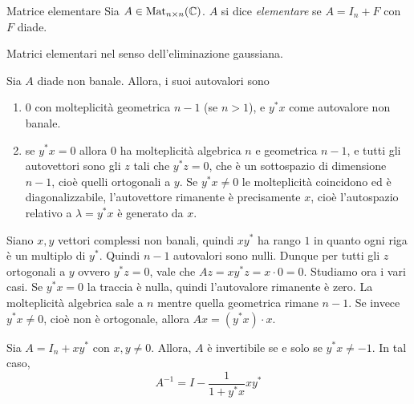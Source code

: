 \documentclass[a4paper]{article}
\begin{document}
\begin{snippetdefinition}{Matrice elementare}
    Sia \(A \in \operatorname{Mat}_{n \times n}(\mathbb{C})\).
    \(A\) si dice \emph{elementare} se \(A = I_n + F\)
    con \(F\) diade.
\end{snippetdefinition}

Matrici elementari nel senso dell'eliminazione gaussiana.

\begin{snippetproposition}{}
    Sia \(A\) diade non banale. Allora, i suoi autovalori sono
    \begin{enumerate}
        \item \(0\) con molteplicità geometrica \(n-1\) (se \(n>1\)),
            e \(y^*x\) come autovalore non banale.
        \item se \(y^*x = 0\) allora \(0\) ha molteplicità algebrica \(n\) e geometrica \(n-1\),
            e tutti gli autovettori sono gli \(z\) tali che \(y^*z = 0\), che è un sottospazio di dimensione \(n-1\), cioè quelli ortogonali a \(y\).
            Se \(y^*x \neq 0\) le molteplicità coincidono ed è diagonalizzabile, l'autovettore rimanente è precisamente \(x\),
            cioè l'autospazio relativo a \(\lambda = y^*x\) è generato da \(x\).
    \end{enumerate}
\end{snippetproposition}

\begin{snippetproof}{}
    Siano \(x,y\) vettori complessi non banali, quindi \(xy^*\) ha rango \(1\)
    in quanto ogni riga è un multiplo di \(y^*\).
    Quindi \(n-1\) autovalori sono nulli.
    Dunque per tutti gli \(z\) ortogonali a \(y\) ovvero \(y^*z = 0\),
    vale che \(Az = xy^*z = x \cdot 0 = 0\).
    Studiamo ora i vari casi. Se \(y^*x=0\) la traccia è nulla, quindi l'autovalore rimanente è zero.
    La molteplicità algebrica sale a \(n\) mentre quella geometrica rimane \(n-1\).
    Se invece \(y^*x \neq 0\), cioè non è ortogonale, allora \(Ax = (y^*x)\cdot x\).
\end{snippetproof}

\begin{snippettheorem}{}
    Sia \(A = I_n + xy^*\) con \(x,y \neq 0\).
    Allora, \(A\) è invertibile se e solo se \(y^*x \neq -1\).
    In tal caso,
    \[
        A^{-1} = I - \frac{1}{1 + y^*x} xy^*
    \]
\end{snippettheorem}
\end{document}
